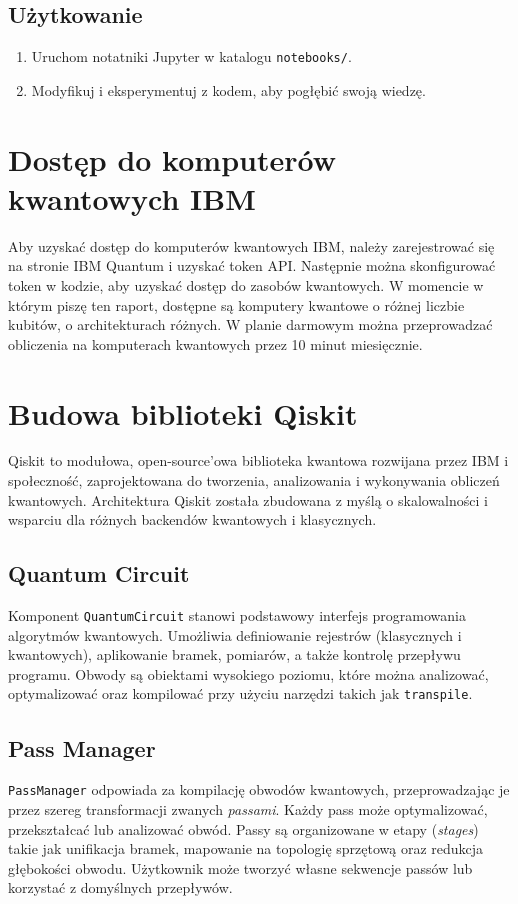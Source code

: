 \documentclass[a4paper,12pt]{article}
\begin{document}
\subsection{Użytkowanie}

\begin{enumerate}
    \item Uruchom notatniki Jupyter w katalogu \texttt{notebooks/}.
    \item Modyfikuj i eksperymentuj z kodem, aby pogłębić swoją wiedzę.
\end{enumerate}

\section{Dostęp do komputerów kwantowych IBM}
Aby uzyskać dostęp do komputerów kwantowych IBM, należy zarejestrować się na
stronie IBM Quantum i uzyskać token API. Następnie można skonfigurować
token w kodzie, aby uzyskać dostęp do zasobów kwantowych. W momencie w którym
piszę ten raport, dostępne są komputery kwantowe o %
różnej liczbie kubitów, o architekturach różnych. W planie darmowym można
przeprowadzać obliczenia na komputerach kwantowych przez 10 minut miesięcznie.

\section{Budowa biblioteki Qiskit}

Qiskit to modułowa, open-source'owa biblioteka kwantowa rozwijana przez IBM i społeczność, zaprojektowana do tworzenia, analizowania i wykonywania obliczeń kwantowych. Architektura Qiskit została zbudowana z myślą o skalowalności i wsparciu dla różnych backendów kwantowych i klasycznych.

\subsection{Quantum Circuit}
Komponent \texttt{QuantumCircuit} stanowi podstawowy interfejs programowania algorytmów kwantowych. Umożliwia definiowanie rejestrów (klasycznych i kwantowych), aplikowanie bramek, pomiarów, a także kontrolę przepływu programu. Obwody są obiektami wysokiego poziomu, które można analizować, optymalizować oraz kompilować przy użyciu narzędzi takich jak \texttt{transpile}.

\subsection{Pass Manager}
\texttt{PassManager} odpowiada za kompilację obwodów kwantowych, przeprowadzając je przez szereg transformacji zwanych \textit{passami}. Każdy pass może optymalizować, przekształcać lub analizować obwód. Passy są organizowane w etapy (\textit{stages}) takie jak unifikacja bramek, mapowanie na topologię sprzętową oraz redukcja głębokości obwodu. Użytkownik może tworzyć własne sekwencje passów lub korzystać z domyślnych przepływów.
\end{document}
